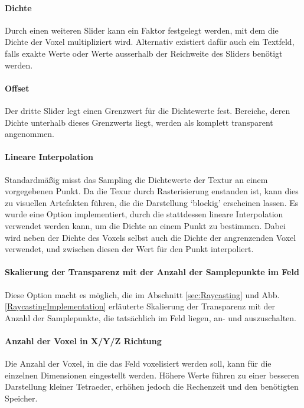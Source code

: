 \documentclass[a4paper,fontsize=12pt,toc=bib,halfparskip]{scrartcl}
\begin{document}
\paragraph{Dichte}
Durch einen weiteren Slider kann ein Faktor festgelegt werden, mit dem die Dichte der Voxel multipliziert wird. Alternativ existiert daf\"ur auch ein Textfeld, falls exakte Werte oder Werte ausserhalb der Reichweite des Sliders ben\"otigt werden.

\paragraph{Offset}
Der dritte Slider legt einen Grenzwert f\"ur die Dichtewerte fest. Bereiche, deren Dichte unterhalb dieses Grenzwerts liegt, werden als komplett transparent angenommen.

\paragraph{Lineare Interpolation}
Standardm\"a{\ss}ig misst das Sampling die Dichtewerte der Textur an einem vorgegebenen Punkt. Da die Texur durch Rasterisierung enstanden ist, kann dies zu visuellen Artefakten f\"uhren, die die Darstellung `blockig' erscheinen lassen. Es wurde eine Option implementiert, durch die stattdessen lineare Interpolation verwendet werden kann, um die Dichte an einem Punkt zu bestimmen. Dabei wird neben der Dichte des Voxels selbst auch die Dichte der angrenzenden Voxel verwendet, und zwischen diesen der Wert f\"ur den Punkt interpoliert.

\paragraph{Skalierung der Transparenz mit der Anzahl der Samplepunkte im Feld}
Diese Option macht es m\"oglich, die im Abschnitt \ref{sec:Raycasting} und Abb. \ref{RaycastingImplementation} erl\"auterte Skalierung der Transparenz mit der Anzahl der Samplepunkte, die tats\"achlich im Feld liegen, an- und auszuschalten.

\paragraph{Anzahl der Voxel in X/Y/Z Richtung}
Die Anzahl der Voxel, in die das Feld voxelisiert werden soll, kann f\"ur die einzelnen Dimensionen eingestellt werden. H\"ohere Werte f\"uhren zu einer besseren Darstellung kleiner Tetraeder, erh\"ohen jedoch die Rechenzeit und den ben\"otigten Speicher.
\end{document}
